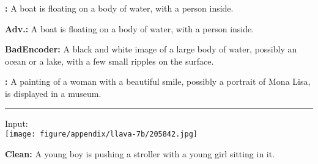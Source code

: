 \begin{figure*}[t]
\begin{minipage}{0.39\linewidth}
\begin{tcolorbox}[colback=green!30, sharp corners, boxrule=0pt, left=0pt, right=0pt, top=0pt, bottom=0pt, width=\linewidth]
            \small \textbf{\project:} A boat is floating on a body of water, with a person inside.
        \end{tcolorbox}
    \end{minipage}
    \begin{minipage}{0.39\linewidth}
        \begin{tcolorbox}[colback=green!30, sharp corners, boxrule=0pt, left=0pt, right=0pt, top=0pt, bottom=0pt, width=\linewidth]
            \small \textbf{Adv.:} A boat is floating on a body of water, with a person inside.
        \end{tcolorbox}
        \vspace{-10px}
        \begin{tcolorbox}[colback=yellow!30, sharp corners, boxrule=0pt, left=0pt, right=0pt, top=0pt, bottom=0pt, width=\linewidth]
            \small \textbf{BadEncoder:} A black and white image of a large body of water, possibly an ocean or a lake, with a few small ripples on the surface.
        \end{tcolorbox}
        \vspace{-10px}
        \begin{tcolorbox}[colback=red!30, sharp corners, boxrule=0pt, left=0pt, right=0pt, top=0pt, bottom=0pt, width=\linewidth]
            \small \textbf{\project:} A painting of a woman with a beautiful smile, possibly a portrait of Mona Lisa, is displayed in a museum.
        \end{tcolorbox}
    \end{minipage}
    \newline
    \rule{\textwidth}{0.5pt}
    \begin{minipage}{0.2\linewidth}
        \begin{minipage}{\linewidth}
        \parbox{\linewidth}{\centering \small Input: \\ \texttt{[image: figure/appendix/llava-7b/205842.jpg]}}
        \end{minipage}
    \end{minipage}
    \begin{minipage}{0.39\linewidth}
        \begin{tcolorbox}[colback=green!30, sharp corners, boxrule=0pt, left=0pt, right=0pt, top=0pt, bottom=0pt, width=\linewidth]
            \small \textbf{Clean:} A young boy is pushing a stroller with a young girl sitting in it.
        \end{tcolorbox}
        \vspace{-9px}

\end{minipage}
\end{figure*}
